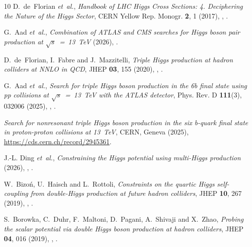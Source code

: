 \documentclass{SciPost}
\providecommand{\DIFaddbegin}{} %
\providecommand{\DIFaddend}{} %
\providecommand{\DIFdelbegin}{} %
\providecommand{\DIFdelend}{} %
\begin{document}
\begin{thebibliography}{10}
D.~de~Florian \emph{et~al.},
\newblock \emph{{Handbook of LHC Higgs Cross Sections: 4. Deciphering the Nature of the Higgs Sector}},
\newblock CERN Yellow Rep. Monogr. \textbf{2}, 1 (2017),
\newblock {},
\newblock {}.

G.~Aad \emph{et~al.},
\newblock \emph{{Combination of ATLAS and CMS searches for Higgs boson pair production at $\sqrt{s}$~=~13~TeV}}  (2026),
\newblock {}.

D.~de~Florian, I.~Fabre and J.~Mazzitelli,
\newblock \emph{{Triple Higgs production at hadron colliders at NNLO in QCD}},
\newblock JHEP \textbf{03}, 155 (2020),
\newblock {},
\newblock {}.

G.~Aad \emph{et~al.},
\newblock \emph{{Search for triple Higgs boson production in the 6b final state using pp collisions at $\sqrt{s}$~=~13~TeV with the ATLAS detector}},
\newblock Phys. Rev. D \textbf{111}(3), 032006 (2025),
\newblock {},
\newblock {}.

\emph{{Search for nonresonant triple Higgs boson production in the six b-quark final state in proton-proton collisions at 13~TeV}},
\newblock CERN, Geneva (2025),
\newblock \href{https://cds.cern.ch/record/2945361}{https://cds.cern.ch/record/2945361}.

J.-L. Ding \emph{et~al.},
\newblock \emph{{Constraining the Higgs potential using multi-Higgs production}}  (2026),
\newblock {},
\newblock {}.

W.~Bizo\'n, U.~Haisch and L.~Rottoli,
\newblock \emph{{Constraints on the quartic Higgs self-coupling from double-Higgs production at future hadron colliders}},
\newblock JHEP \textbf{10}, 267 (2019),
\newblock \DIFdelbegin %
\DIFdelend \DIFaddbegin {}\DIFaddend ,
\newblock {}.

S.~Borowka, C.~Duhr, F.~Maltoni, D.~Pagani, A.~Shivaji and X.~Zhao,
\newblock \emph{{Probing the scalar potential via double Higgs boson production at hadron colliders}},
\newblock JHEP \textbf{04}, 016 (2019),
\newblock {},
\newblock {}.


\end{thebibliography}
\end{document}
